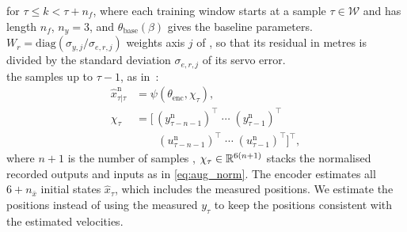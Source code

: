 {\begin{equation}
\end{equation}
for $\tau\le k<\tau+n_f$, where each training window starts at a sample
$\tau\in\mathcal W$ and has length $n_f$, $n_y=3$, and
$\theta_{\mathrm{base}}(\beta)$ gives the baseline parameters.
$W_r=\mathrm{diag}(\sigma_{y,j}/\sigma_{e,r,j})$ weights axis $j$ of , so that its residual in metres is divided by the standard
deviation $\sigma_{e,r,j}$ of its servo error.
}
\\
 the samples up to $\tau-1$,
as in~\cite[Eq.~(22e)]{hoekstra2026lfr}:
\begin{equation}
\begin{aligned}
 \hat x^{\mathrm n}_{\tau|\tau}
 &=\psi(\theta_{\mathrm{enc}},\chi_\tau),\\
 \chi_\tau&=\bigl[\,(y^{\mathrm n}_{\tau-n-1})^\top\;\cdots\;(y^{\mathrm n}_{\tau-1})^\top\\
 &\qquad(u^{\mathrm n}_{\tau-n-1})^\top\;\cdots\;(u^{\mathrm n}_{\tau-1})^\top\bigr]^\top,
\end{aligned}
 \label{eq:aug_encoder}
\end{equation}
where 
$n+1$ is the number of samples ,
$\chi_\tau\in\mathbb{R}^{6(n+1)}$ stacks the normalised recorded
outputs and inputs as in \eqref{eq:aug_norm}.
The encoder estimates all $6+n_{\bar x}$ initial states $\hat x_\tau$, 
which includes the measured positions.
We estimate the positions instead of using the measured $y_\tau$ to keep 
the positions consistent with the estimated velocities.

